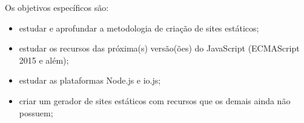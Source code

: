 \documentclass[ppginf, pep]{esinucpel}
\begin{document}
Os objetivos específicos são:
\begin{itemize}
	
	\item estudar e aprofundar a metodologia de criação de sites estáticos;
	\item estudar os recursos das próxima(s) versão(ões) do JavaScript (ECMAScript 2015 e além);
	\item estudar as plataformas Node.js e io.js;
    \item criar um gerador de sites estáticos com recursos que os demais ainda não possuem;

\end{itemize}
%
%
%
\end{document}
